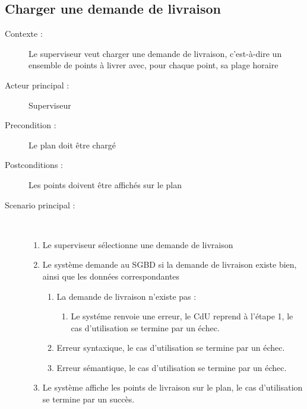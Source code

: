 \subsection{Charger une demande de livraison}
\begin{description}
    \item[Contexte :] Le superviseur veut charger une demande de livraison, c'est-\`a-dire un ensemble de points \`a livrer avec, pour chaque point, sa
    plage horaire
    \item[Acteur principal :] Superviseur
    \item[Precondition :] Le plan doit \^etre charg\'e
    \item[Postconditions :] Les points doivent \^etre affich\'es sur le plan
    \item[Scenario principal :] ~
    \begin{enumerate}
        \item Le superviseur s\'electionne une demande de livraison
        \item Le syst\`eme demande au SGBD si la demande de livraison existe bien, ainsi que les donn\'ees correspondantes
        \begin{enumerate}
            \item La demande de livraison n'existe pas :
            \begin{enumerate}
                \item Le syst\'eme renvoie une erreur, le CdU reprend \`a l'\'etape 1, le cas d'utilisation se termine par un \'echec.
            \end{enumerate}
            \item Erreur syntaxique, le cas d'utilisation se termine par un \'echec.
            \item Erreur s\'emantique, le cas d'utilisation se termine par un \'echec.
        \end{enumerate}
        \item Le syst\`eme affiche les points de livraison sur le plan, le cas d'utilisation se termine par un succ\`es.
    \end{enumerate}
\end{description}

